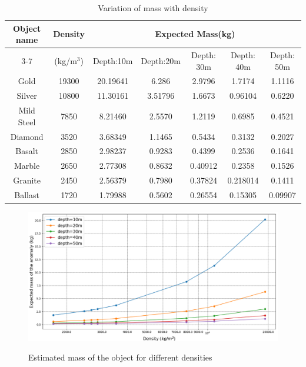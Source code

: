 \documentclass[a4paper,11pt]{article}
\begin{document}
\begin{table}[h]
\centering
\caption{Variation of mass with density}
\vspace{.2cm}
\begin{tabular}{|c|c|c|c|c|c|c|}
\hline
\multirow{2}{*}{Object name\vspace{.3cm}}&\multirow{2}{*}{Density\vspace{.5cm}}&\multicolumn{5}{|c|}{Expected Mass(kg)}\\ 
\cline{3-7}
&\small{(kg/m$^{3}$)}&Depth:10m & Depth:20m & Depth: 30m&Depth: 40m&Depth: 50m \\
 \hline
 Gold & 19300&20.19641 & 6.286 & 2.9796 & 1.7174 & 1.1116 \\
 \hline
Silver &10800 & 11.30161 & 3.51796 &1.6673 & 0.96104 & 0.6220 \\
 \hline
  Mild Steel & 7850 &8.21460 & 2.5570 & 1.2119 & 0.6985 & 0.4521 \\
 \hline
 Diamond & 3520 &3.68349 & 1.1465 & 0.5434 & 0.3132  & 0.2027 \\
\hline
Basalt & 2850 &2.98237 & 0.9283& 0.4399 & 0.2536 &0.1641 \\
 \hline
 Marble & 2650 & 2.77308 & 0.8632 & 0.40912 & 0.2358 & 0.1526 \\
 \hline
 Granite & 2450 & 2.56379 & 0.7980 & 0.37824 & 0.218014 & 0.1411\\
 \hline
 Ballast & 1720 & 1.79988 & 0.5602 &0.26554& 0.15305 & 0.09907  \\
 \hline
\end{tabular}
\label{tpl}
\end{table}

\begin{figure}
    \centering
     \caption{Estimated mass of the object for different densities}
      \includegraphics [scale=.5] {plots/depth(10-50).png }
    \label{T_r}
\end{figure}






\newpage


\end{document}
